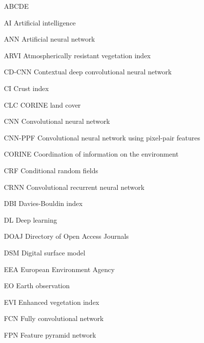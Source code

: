 
\begin{seznamzkratek}{ABCDE}

	      {AI}
	      {\qquad Artificial intelligence}

	      {ANN}
	      {\qquad Artificial neural network}

	      {ARVI}
	      {\qquad Atmospherically resistant vegetation index}

	      {CD-CNN}
	      {\hspace{5.0mm} Contextual deep convolutional neural network}

	      {CI}
	      {\qquad Crust index}

	      {CLC}
	      {\qquad CORINE land cover}

	      {CNN}
	      {\qquad Convolutional neural network}

	      {CNN-PPF}
	      {\hspace{2.9mm} Convolutional neural network using pixel-pair features}

	      {CORINE}
	      {\hspace{5.0mm} Coordination of information on the environment}

	      {CRF}
	      {\qquad Conditional random fields}

	      {CRNN}
	      {\qquad Convolutional recurrent neural network}

	      {DBI}
	      {\qquad Davies-Bouldin index}

	      {DL}
	      {\qquad Deep learning}

	      {DOAJ}
	      {\qquad Directory of Open Access Journals}

	      {DSM}
	      {\qquad Digital surface model}

	      {EEA}
	      {\qquad European Environment Agency}

	      {EO}
	      {\qquad Earth observation}

	      {EVI}
	      {\qquad Enhanced vegetation index}

	      {FCN}
	      {\qquad Fully convolutional network}

	      {FPN}
	      {\qquad Feature pyramid network}


\end{seznamzkratek}
